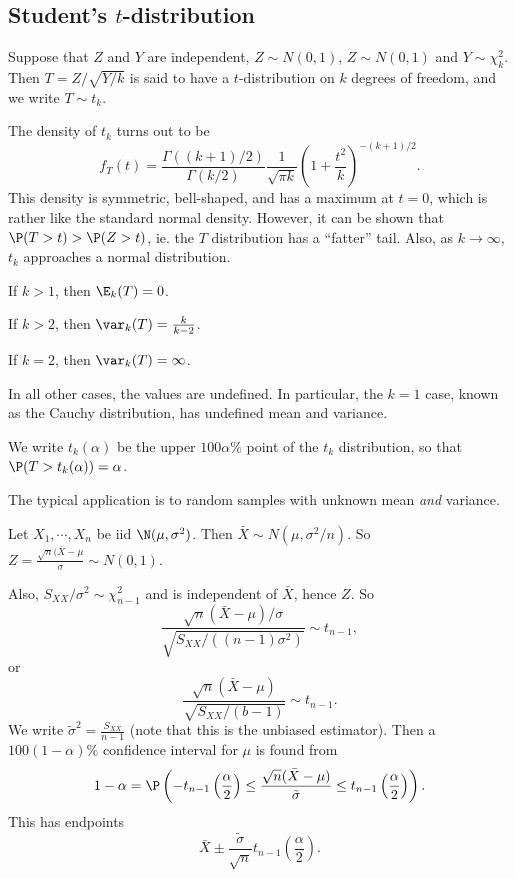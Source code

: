 \documentclass[a4paper]{article}
\begin{document}
\subsection{Student's \texorpdfstring{$t$}{t}-distribution}
Suppose that $Z$ and $Y$ are independent, $Z\sim N(0, 1)$, $Z\sim N(0, 1)$ and $Y\sim \chi_k^2$. Then $T = Z/\sqrt{Y/k}$ is said to have a $t$-distribution on $k$ degrees of freedom, and we write $T\sim t_k$.

The density of $t_k$ turns out to be
\[
  f_T(t) = \frac{\Gamma((k + 1)/2)}{\Gamma(k/2)} \frac{1}{\sqrt{\pi k}}\left(1 + \frac{t^2}{k}\right)^{-(k+1)/2}.
\]
This density is symmetric, bell-shaped, and has a maximum at $t = 0$, which is rather like the standard normal density. However, it can be shown that $\P(T > t) > \P(Z > t)$, ie. the $T$ distribution has a ``fatter'' tail. Also, as $k \to \infty$, $t_k$ approaches a normal distribution.

\begin{prop}
  If $k > 1$, then $\E_k(T) = 0$.

  If $k > 2$, then $\var_k(T) = \frac{k}{k - 2}$.

  If $k = 2$, then $\var_k(T) = \infty$.

  In all other cases, the values are undefined. In particular, the $k = 1$ case, known as the Cauchy distribution, has undefined mean and variance.
\end{prop}

\begin{notation}
  We write $t_k(\alpha)$ be the upper $100\alpha\%$ point of the $t_k$ distribution, so that $\P(T > t_k(\alpha)) = \alpha$.
\end{notation}

The typical application is to random samples with unknown mean \emph{and} variance.

Let $X_1, \cdots, X_n$ be iid $\N(\mu, \sigma^2)$. Then $\bar X \sim N(\mu, \sigma^2/n)$. So $Z = \frac{\sqrt{n}(\bar X - \mu}{\sigma} \sim N(0, 1)$.

Also, $S_{XX}/\sigma^2 \sim \chi^2_{n - 1}$ and is independent of $\bar X$, hence $Z$. So
\[
  \frac{\sqrt{n}(\bar X - \mu)/\sigma}{\sqrt{S_{XX}/((n - 1)\sigma^2)}} \sim t_{n - 1},
\]
or
\[
  \frac{\sqrt{n}(\bar X - \mu)}{\sqrt{S_{XX}/(b - 1)}} \sim t_{n - 1}.
\]
We write $\tilde{\sigma}^2 = \frac{S_{XX}}{n - 1}$ (note that this is the unbiased estimator). Then a $100(1 - \alpha)\%$ confidence interval for $\mu$ is found from
\[
  1 - \alpha = \P\left(-t_{n - 1}\left(\frac{\alpha}{2}\right) \leq \frac{\sqrt{n}(\bar X - \mu)}{\tilde{\sigma}} \leq t_{n - 1}\left(\frac{\alpha}{2}\right)\right).
\]
This has endpoints
\[
  \bar X \pm \frac{\tilde{\sigma}}{\sqrt{n}}t_{n - 1}\left(\frac{\alpha}{2}\right).
\]
\end{document}
